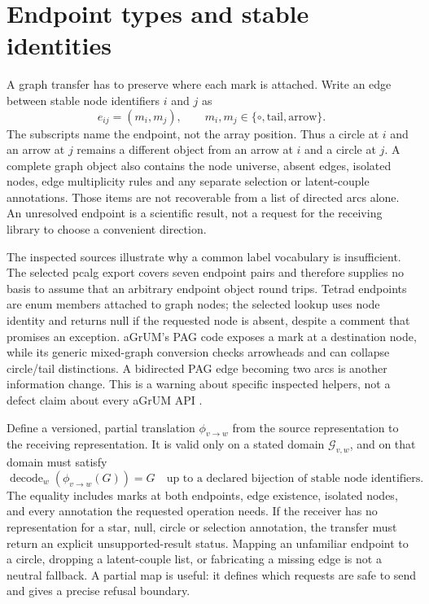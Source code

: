 \section{Endpoint types and stable identities}

A graph transfer has to preserve where each mark is attached. Write an edge
between stable node identifiers $i$ and $j$ as
\begin{equation}
  e_{ij}=(m_i,m_j),\qquad
  m_i,m_j\in\{\circ,\text{tail},\text{arrow}\}.
  \label{exec17:s9-edge-contract}
\end{equation}
The subscripts name the endpoint, not the array position. Thus a circle at $i$
and an arrow at $j$ remains a different object from an arrow at $i$ and a
circle at $j$. A complete graph object also contains the node universe, absent
edges, isolated nodes, edge multiplicity rules and any separate selection or
latent-couple annotations. Those items are not recoverable from a list of
directed arcs alone. An unresolved endpoint is a scientific result, not a
request for the receiving library to choose a convenient direction.

The inspected sources illustrate why a common label vocabulary is
insufficient. The selected pcalg export covers seven endpoint pairs and
therefore supplies no basis to assume that an arbitrary endpoint object round
trips. Tetrad endpoints are enum members attached to graph nodes; the selected
lookup uses node identity and returns null if the requested node is absent,
despite a comment that promises an exception. aGrUM's PAG code exposes a mark
at a destination node, while its generic mixed-graph conversion checks
arrowheads and can collapse circle/tail distinctions. A bidirected PAG edge
becoming two arcs is another information change. This is a warning about
specific inspected helpers, not a defect claim about every aGrUM API
\citep{exec13_latentr_primary,exec14_java_latent_sources,exec14_native_agrum}.

Define a versioned, partial translation $\phi_{v\to w}$ from the source
representation to the receiving representation. It is valid only on a stated
domain $\mathcal G_{v,w}$, and on that domain must satisfy
\begin{equation}
  \operatorname{decode}_w\!\left(\phi_{v\to w}(G)\right)=G
  \quad\text{up to a declared bijection of stable node identifiers.}
  \label{exec17:s9-round-trip}
\end{equation}
The equality includes marks at both endpoints, edge existence, isolated nodes,
and every annotation the requested operation needs. If the receiver has no
representation for a star, null, circle or selection annotation, the transfer
must return an explicit unsupported-result status. Mapping an unfamiliar
endpoint to a circle, dropping a latent-couple list, or fabricating a missing
edge is not a neutral fallback. A partial map is useful: it defines which
requests are safe to send and gives a precise refusal boundary.

